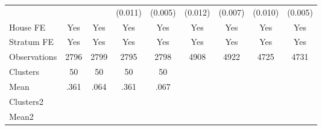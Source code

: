 {\begin{tabular}{l*{8}{c}}
                &                  &                  &  (0.011)         &  (0.005)         &  (0.012)         &  (0.007)         &  (0.010)         &  (0.005)         \\
House FE        &      Yes         &      Yes         &      Yes         &      Yes         &      Yes         &      Yes         &      Yes         &      Yes         \\
Stratum FE      &      Yes         &      Yes         &      Yes         &      Yes         &      Yes         &      Yes         &      Yes         &      Yes         \\
\midrule
Observations    &     2796         &     2799         &     2795         &     2798         &     4908         &     4922         &     4725         &     4731         \\
Clusters        &       50         &       50         &       50         &       50         &                  &                  &                  &                  \\
Mean            &     .361         &     .064         &     .361         &     .067         &                  &                  &                  &                  \\
Clusters2       &                  &                  &                  &                  &                  &                  &                  &                  \\
Mean2           &                  &                  &                  &                  &                  &                  &                  &                  \\
\bottomrule
\end{tabular}
}

